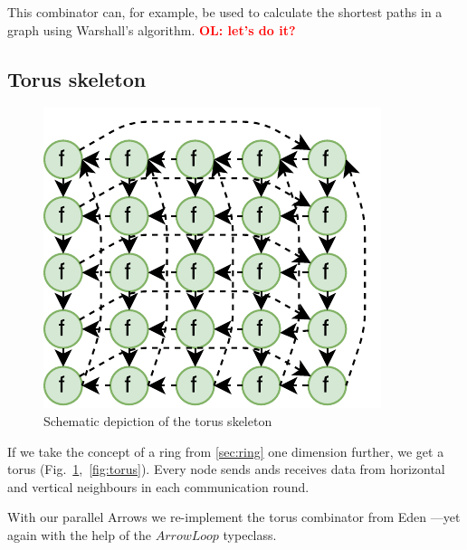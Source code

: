 \documentclass{jfp1}
\newcommand{\Conid}[1]{\mathit{#1}}
\renewcommand{\cite}[1]{\citep{#1}}
\newcommand{\comm}[2]{\textcolor{red}{\bfseries #1: #2}}
\newcommand{\olcomment}[1]{\comm{OL}{#1}}
\begin{document}
This combinator can, for example, be used to calculate the shortest paths in a graph using Warshall's algorithm.
\olcomment{let's do it?}
\subsection{Torus skeleton}
\begin{figure}
	\includegraphics[scale=0.75]{images/torus}
	\caption{Schematic depiction of the torus skeleton}
	\label{fig:ringTorusImg}
\end{figure}
If we take the concept of a ring from \ref{sec:ring} one dimension further, we get a torus (Fig.~\ref{fig:ringTorusImg},~\ref{fig:torus}). Every node sends ands receives data from horizontal and vertical neighbours in each communication round.

With our parallel Arrows we re-implement the torus combinator from Eden \citep{eden_skel_topology}---yet again with the help of the \ensuremath{\Conid{ArrowLoop}} typeclass.
\end{document}
